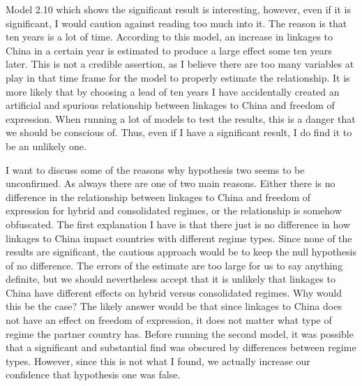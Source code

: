 Model 2.10 which shows the significant result is interesting, however, even if it is significant, I would caution against reading too much into it. The reason is that ten years is a lot of time. According to this model, an increase in linkages to China in a certain year is estimated to produce a large effect some ten years later. This is not a credible assertion, as I believe there are too many variables at play in that time frame for the model to properly estimate the relationship. It is more likely that by choosing a lead of ten years I have accidentally created an artificial and spurious relationship between linkages to China and freedom of expression. When running a lot of models to test the results, this is a danger that we should be conscious of. Thus, even if I have a significant result, I do find it to be an unlikely one. 

I want to discuss some of the reasons why hypothesis two seems to be unconfirmed. As always there are one of two main reasons.  Either there is no difference in the relationship between linkages to China and freedom of expression for hybrid  and consolidated regimes, or the relationship is somehow obfuscated. The first explanation I have is that there just is no difference in how linkages to China impact countries with different regime types. Since none of the results are significant, the cautious approach would be to keep the null hypothesis of no difference. The errors of the estimate are too large for us to say anything definite, but we should nevertheless accept that it is unlikely that linkages to China have different effects on hybrid versus consolidated regimes. Why would this be the case? The likely answer would be that since linkages to China does not have an effect on freedom of expression, it does not matter what type of regime the partner country has. Before running the second model, it was possible that a significant and substantial find was obscured by differences between regime types. However, since this is not what I found, we actually increase our confidence that hypothesis one was false.

